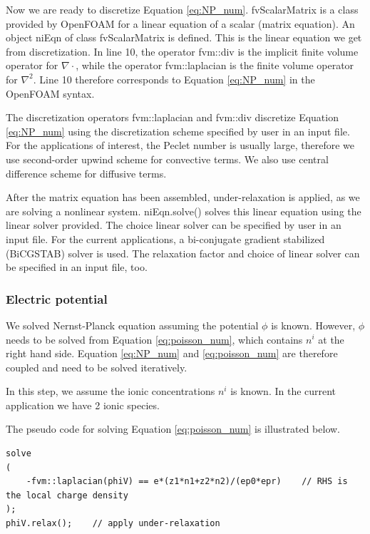 Now we are ready to discretize Equation \ref{eq:NP_num}. \textsf{fvScalarMatrix} is a class provided by OpenFOAM for a linear equation of a scalar (matrix equation). An object \textsf{niEqn} of class \textsf{fvScalarMatrix} is defined. This is the linear equation we get from discretization. In line 10, the operator \textsf{fvm::div} is the implicit finite volume operator for $\nabla \cdot$, while the operator \textsf{fvm::laplacian} is the finite volume operator for $\nabla^2$. Line 10 therefore corresponds to Equation \ref{eq:NP_num} in the OpenFOAM syntax. 

The discretization operators \textsf{fvm::laplacian} and \textsf{fvm::div} discretize Equation \ref{eq:NP_num} using the discretization scheme specified by user in an input file. For the applications of interest, the Peclet number is usually large, therefore we use second-order upwind scheme for convective terms. We also use central difference scheme for diffusive terms.

After the matrix equation has been assembled, under-relaxation is applied, as we are solving a nonlinear system. \textsf{niEqn.solve()} solves this linear equation using the linear solver provided. The choice linear solver can be specified by user in an input file. For the current applications, a bi-conjugate gradient stabilized (BiCGSTAB) solver is used. The relaxation factor and choice of linear solver can be specified in an input file, too.

\subsubsection{Electric potential}

We solved Nernst-Planck equation assuming the potential $\phi$ is known. However, $\phi$ needs to be solved from Equation \ref{eq:poisson_num}, which contains $n^i$ at the right hand side. Equation \ref{eq:NP_num} and \ref{eq:poisson_num} are therefore coupled and need to be solved iteratively.

In this step, we assume the ionic concentrations $n^i$ is known. In the current application we have 2 ionic species.

The pseudo code for solving Equation \ref{eq:poisson_num} is illustrated below.

\begin{lstlisting}
solve
(
    -fvm::laplacian(phiV) == e*(z1*n1+z2*n2)/(ep0*epr)    // RHS is the local charge density
);
phiV.relax();    // apply under-relaxation
\end{lstlisting}

